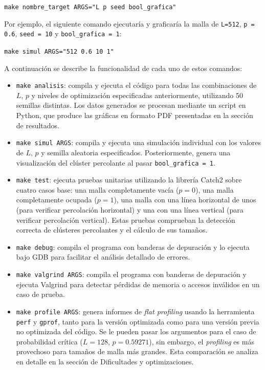 \documentclass[%
 reprint,
 amsmath,amssymb,
 aps,
]{revtex4-2}
\begin{document}
\begin{center}
    \texttt{make nombre\_target ARGS="L p seed bool\_grafica"}
\end{center}


Por ejemplo, el siguiente comando ejecutaría y graficaría la malla de \texttt{L=512}, \texttt{p = 0.6}, \texttt{seed = 10} y \texttt{bool\_grafica = 1}:

\begin{center}
    \texttt{make simul ARGS="512 0.6 10 1"}
\end{center}

A continuación se describe la funcionalidad de cada uno de estos comandos:

\begin{itemize}
    \item \texttt{make analisis}: compila y ejecuta el código para todas las combinaciones de \( L \), \( p \) y niveles de optimización especificadas anteriormente, utilizando 50 semillas distintas. Los datos generados se procesan mediante un script en Python, que produce las gráficas en formato PDF presentadas en la sección de resultados.

    \item \texttt{make simul ARGS}: compila y ejecuta una simulación individual con los valores de \( L \), \( p \) y semilla aleatoria especificados. Posteriormente, genera una visualización del clúster percolante al pasar \texttt{bool\_grafica = 1}.
    
    \item \texttt{make test}: ejecuta pruebas unitarias utilizando la librería Catch2 sobre cuatro casos base: una malla completamente vacía (\( p = 0 \)), una malla completamente ocupada (\( p = 1 \)), una malla con una línea horizontal de unos (para verificar percolación horizontal) y una con una línea vertical (para verificar percolación vertical). Estas pruebas comprueban la detección correcta de clústeres percolantes y el cálculo de sus tamaños.
    
    \item \texttt{make debug}: compila el programa con banderas de depuración y lo ejecuta bajo GDB para facilitar el análisis detallado de errores.
    
    \item \texttt{make valgrind ARGS}: compila el programa con banderas de depuración y ejecuta Valgrind para detectar pérdidas de memoria o accesos inválidos en un caso de prueba.
    
    \item \texttt{make profile ARGS}: genera informes de \textit{flat profiling} usando la herramienta \texttt{perf} y \texttt{gprof}, tanto para la versión optimizada como para una versión previa no optimizada del código. Se le pueden pasar los argumentos para el caso de probabilidad crítica (\( L = 128 \), \( p = 0.59271 \)), sin embargo, el \textit{profiling} es más provechoso para tamaños de malla más grandes. Esta comparación se analiza en detalle en la sección de Dificultades y optimizaciones.
    

\end{itemize}
\end{document}
